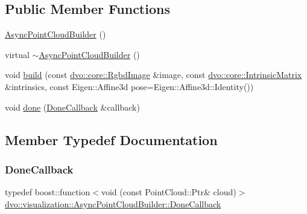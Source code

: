 \subsection*{Public Member Functions}
\begin{DoxyCompactItemize}
\item 
\mbox{\hyperlink{classdvo_1_1visualization_1_1_async_point_cloud_builder_ab070aedbbd9aa5feef1d7808ca40b368}{Async\+Point\+Cloud\+Builder}} ()
\item 
virtual \mbox{\hyperlink{classdvo_1_1visualization_1_1_async_point_cloud_builder_a73217b33adf0d739b98fcec32756a6ed}{$\sim$\+Async\+Point\+Cloud\+Builder}} ()
\item 
void \mbox{\hyperlink{classdvo_1_1visualization_1_1_async_point_cloud_builder_a8347f241fd74e390aedaebfe4ce5c619}{build}} (const \mbox{\hyperlink{structdvo_1_1core_1_1_rgbd_image}{dvo\+::core\+::\+Rgbd\+Image}} \&image, const \mbox{\hyperlink{structdvo_1_1core_1_1_intrinsic_matrix}{dvo\+::core\+::\+Intrinsic\+Matrix}} \&intrinsics, const Eigen\+::\+Affine3d pose=Eigen\+::\+Affine3d\+::\+Identity())
\item 
void \mbox{\hyperlink{classdvo_1_1visualization_1_1_async_point_cloud_builder_a64258774d1203a294842d2a45bccc121}{done}} (\mbox{\hyperlink{classdvo_1_1visualization_1_1_async_point_cloud_builder_aeea54b24aabbcfe12b2db923c8befc77}{Done\+Callback}} \&callback)
\end{DoxyCompactItemize}


\subsection{Member Typedef Documentation}
\mbox{\label{classdvo_1_1visualization_1_1_async_point_cloud_builder_aeea54b24aabbcfe12b2db923c8befc77}} 
\subsubsection{\texorpdfstring{Done\+Callback}{DoneCallback}}
{\footnotesize\ttfamily typedef boost\+::function$<$void (const Point\+Cloud\+::\+Ptr\& cloud)$>$ \mbox{\hyperlink{classdvo_1_1visualization_1_1_async_point_cloud_builder_aeea54b24aabbcfe12b2db923c8befc77}{dvo\+::visualization\+::\+Async\+Point\+Cloud\+Builder\+::\+Done\+Callback}}}

